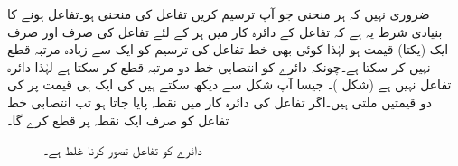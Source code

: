 ضروری نہیں کہ ہر منحنی جو آپ ترسیم کریں تفاعل کی منحنی ہو۔تفاعل ہونے کا بنیادی شرط یہ ہے کہ تفاعل کے دائرہ کار میں ہر  کے لئے تفاعل کی صرف اور صرف ایک (یکتا) قیمت  ہو لہٰذا کوئی بھی  خط تفاعل کی ترسیم کو ایک سے زیادہ مرتبہ قطع نہیں کر سکتا ہے۔چونکہ دائرے کو انتصابی خط دو مرتبہ قطع کر سکتا ہے لہٰذا  دائرہ تفاعل نہیں ہے (شکل )۔ جیسا آپ شکل  سے دیکھ سکتے ہیں  کی ایک ہی قیمت پر  کی دو قیمتیں ملتی ہیں۔اگر تفاعل  کی دائرہ کار میں نقطہ  پایا جاتا ہو تب انتصابی خط  تفاعل کو صرف ایک نقطہ  پر قطع کرے گا۔
\begin{figure}
\centering
{}
\caption{دائرے کو تفاعل تصور کرنا غلط ہے۔}
\label{شکل_ابتدا_دائرہ_تفاعل_نہیں}
\end{figure}

